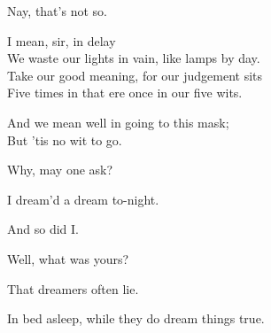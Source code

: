 \begin{speech}
Nay, that's not so. \\
\end{speech}
\begin{speech}
I mean, sir, in delay \\
We waste our lights in vain, like lamps by day. \\
Take our good meaning, for our judgement sits \\
Five times in that ere once in our five wits. \\
\end{speech}
\begin{speech}
And we mean well in going to this mask; \\
But 'tis no wit to go. \\
\end{speech}
\begin{speech}
Why, may one ask? \\
\end{speech}
\begin{speech}
I dream'd a dream to-night. \\
\end{speech}
\begin{speech}
And so did I. \\
\end{speech}
\begin{speech}
Well, what was yours? \\
\end{speech}
\begin{speech}
That dreamers often lie. \\
\end{speech}
\begin{speech}
In bed asleep, while they do dream things true. \\

\end{speech}
